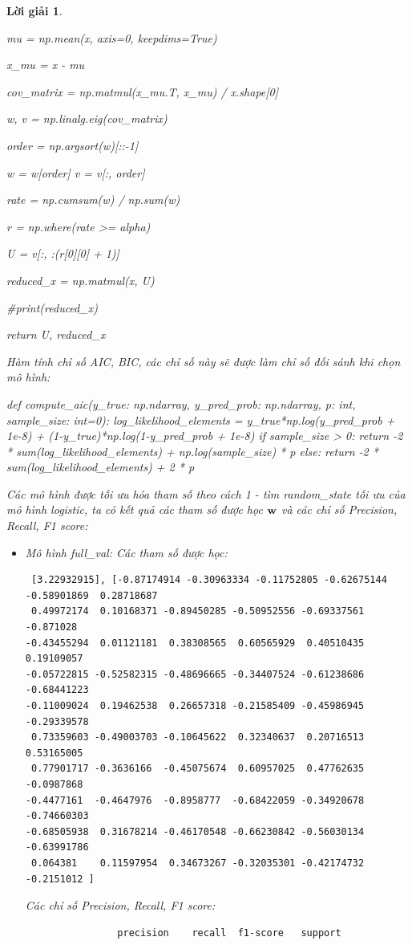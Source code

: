 \documentclass[14pt, a4paper]{article}
\theoremstyle{sltheorem}
\theoremstyle{soltheorem}
\newtheorem*{loigiai}{Lời giải}
\begin{document}
\begin{loigiai}
\begin{python}
    mu = np.mean(x, axis=0, keepdims=True)

    x_mu = x - mu

    cov_matrix = np.matmul(x_mu.T, x_mu) / x.shape[0]

    w, v = np.linalg.eig(cov_matrix)

    order = np.argsort(w)[::-1]

    w = w[order]
    v = v[:, order]

    rate = np.cumsum(w) / np.sum(w)

    r = np.where(rate >= alpha)

    U = v[:, :(r[0][0] + 1)]

    reduced_x = np.matmul(x, U)

    #print(reduced_x)

    return U, reduced_x
    \end{python}

    Hàm tính chỉ số AIC, BIC, các chỉ số này sẽ được làm chỉ số đối sánh khi chọn mô hình:

    \begin{python}
def compute_aic(y_true: np.ndarray, y_pred_prob: np.ndarray, p: int, sample_size: int=0):
    log_likelihood_elements = y_true*np.log(y_pred_prob + 1e-8) + (1-y_true)*np.log(1-y_pred_prob + 1e-8)
    if sample_size > 0:
        return -2 * sum(log_likelihood_elements) + np.log(sample_size) * p
    else:
        return -2 * sum(log_likelihood_elements) + 2 * p
    \end{python}

    Các mô hình được tối ưu hóa tham số theo cách 1 - tìm random\_state tối ưu của mô hình logistic, ta có kết quả các tham số được học $\bold{w}$ và các chỉ số Precision, Recall, F1 score:

    \begin{itemize}
        \item Mô hình full\_val:
        Các tham số được học:
        \begin{verbatim}
 [3.22932915], [-0.87174914 -0.30963334 -0.11752805 -0.62675144 -0.58901869  0.28718687
 0.49972174  0.10168371 -0.89450285 -0.50952556 -0.69337561 -0.871028
-0.43455294  0.01121181  0.38308565  0.60565929  0.40510435  0.19109057
-0.05722815 -0.52582315 -0.48696665 -0.34407524 -0.61238686 -0.68441223
-0.11009024  0.19462538  0.26657318 -0.21585409 -0.45986945 -0.29339578
 0.73359603 -0.49003703 -0.10645622  0.32340637  0.20716513  0.53165005
 0.77901717 -0.3636166  -0.45075674  0.60957025  0.47762635 -0.0987868
-0.4477161  -0.4647976  -0.8958777  -0.68422059 -0.34920678 -0.74660303
-0.68505938  0.31678214 -0.46170548 -0.66230842 -0.56030134 -0.63991786
 0.064381    0.11597954  0.34673267 -0.32035301 -0.42174732 -0.2151012 ]
        \end{verbatim}
        Các chỉ số Precision, Recall, F1 score:
        \begin{verbatim}
                precision    recall  f1-score   support


\end{verbatim}
\end{itemize}
\end{loigiai}
\end{document}
